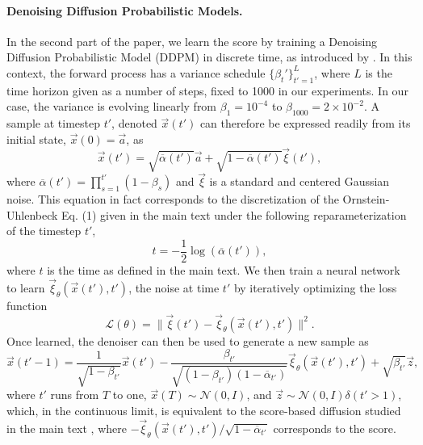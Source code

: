 \documentclass[10pt,twocolumn]{article}
\begin{document}
\paragraph*{Denoising Diffusion Probabilistic Models.}
In the second part of the paper, we learn the score by training a Denoising Diffusion Probabilistic Model (DDPM) in discrete time, as introduced by \cite{Ho2020}. In this context, the forward process has a variance schedule $\{\beta_t'\}_{t'=1}^L$, where $L$ is the time horizon given as a number of steps, fixed to 1000 in our experiments. In our case, the variance is evolving linearly from $\beta_1 = 10^{-4}$ to $\beta_{1000} = 2 \times 10^{-2}$.
A sample at timestep $t'$, denoted $\vec x(t')$ can therefore be expressed readily from its initial state, $\vec x(0) = \vec a$, as
\begin{equation}
    \vec x(t') = \sqrt{\overline{\alpha}(t')} \vec a + \sqrt{1 - \overline{\alpha}(t')} \vec \xi(t'),
\end{equation}
where $\overline{\alpha}(t') = \prod_{s=1}^{t'} (1-\beta_s)$ and $\vec \xi$ is a standard and centered Gaussian noise. This equation in fact corresponds to the discretization of the Ornstein-Uhlenbeck Eq. (1) given in the main text under the following reparameterization of the timestep $t'$,
\begin{equation}
    t = -\frac{1}{2} \log \left( \overline{\alpha}(t')\right),
\end{equation}
where $t$ is the time as defined in the main text.
We then train a neural network to learn $\vec \xi_\theta\left(\vec x(t'), t'\right)$, the noise at time $t'$ by iteratively optimizing the loss function
\begin{equation}
    \mathcal{L}(\theta) = \lVert \vec \xi(t') - \vec \xi_\theta\left(\vec x(t'), t'\right) \rVert^2.
\end{equation}
Once learned, the denoiser can then be used to generate a new sample as
\begin{equation}
    \vec x(t'-1) = \frac{1}{\sqrt{1-\beta_{t'}}} \vec x(t') - \frac{\beta_{t'}}{\sqrt{\left(1 - \beta_{t'}\right) \left(1-\overline{\alpha}_{t'}\right)}} \vec \xi_{\theta}\left(\vec x(t'), t'\right) + \sqrt{\beta_{t'}} \vec z,
\end{equation}
where $t'$ runs from $T$ to one, $\vec x(T) \sim \mathcal{N}(0, I)$, and $\vec z \sim \mathcal{N}(0, I)\delta(t' > 1)$, which, in the continuous limit, is equivalent to the score-based diffusion studied in the main text \cite{luo2022understanding}, where $-\vec \xi_{\theta}\left(\vec x(t'), t'\right)/\sqrt{1 - \overline{\alpha}_{t'}}$ corresponds to the score.
\\
\end{document}
